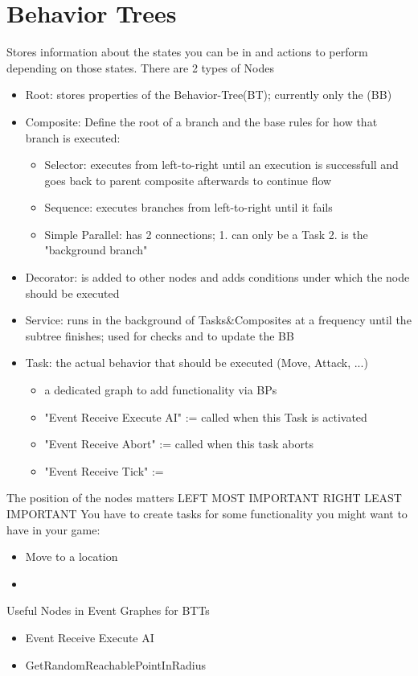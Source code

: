     \section{Behavior Trees}
        Stores information about the states you can be in and actions to perform depending on those states.
        There are 2 types of Nodes
        \begin{itemize}
            \item Root: stores properties of the Behavior-Tree(BT); currently only the  (BB)
            \item Composite: Define the root of a branch and the base rules for how that branch is executed:
            \begin{itemize}
                \item Selector: executes from left-to-right until an execution is successfull and goes back to parent composite afterwards to continue flow
                \item Sequence: executes branches from left-to-right until it fails
                \item Simple Parallel: has 2 connections; 1. can only be a Task 2. is the "background branch"
            \end{itemize}
            \item Decorator: is added to other nodes and adds conditions under which the node should be executed
            \item Service: runs in the background of Tasks\&Composites at a frequency until the subtree finishes; used for checks and to update the BB
            \item Task: the actual behavior that should be executed (Move, Attack, ...)
            \begin{itemize}
                \item a dedicated graph to add functionality via BPs
                \item "Event Receive Execute AI" := called when this Task is activated
                \item "Event Receive Abort" := called when this task aborts
                \item "Event Receive Tick" := %
            \end{itemize} 
        \end{itemize}

    \smallskip
        The position of the nodes matters LEFT MOST IMPORTANT RIGHT LEAST IMPORTANT
    \smallskip
        You have to create tasks for some functionality you might want to have in your game:
        \begin{itemize}
            \item Move to a location
            \item 
        \end{itemize}
    \smallskip
        Useful Nodes in Event Graphes for BTTs
        \begin{itemize}
            \item Event Receive Execute AI
            \item GetRandomReachablePointInRadius
        \end{itemize}

